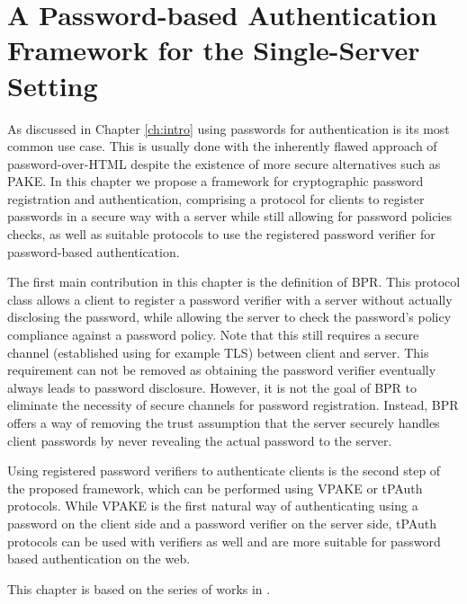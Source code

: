 \chapter[A Password Authentication Framework for the Single-Server Setting]{A Password-based Authentication Framework for the Single-Server Setting} \label{ch:vpake}

As discussed in Chapter \ref{ch:intro} using passwords for authentication is its most common use case. 
This is usually done with the inherently flawed approach of password-over-\ac{HTML} despite the existence of more secure alternatives such as \ac{PAKE}.
In this chapter we propose a framework for cryptographic password registration and authentication, comprising a protocol for clients to register passwords in a secure way with a server while still allowing for password policies checks, as well as suitable protocols to use the registered password verifier for password-based authentication.

The first main contribution in this chapter is the definition of \acl{BPR}.
This protocol class allows a client to register a password verifier with a server without actually disclosing the password, while allowing the server to check the password's policy compliance against a password policy.
Note that this still requires a secure channel (established using for example \ac{TLS}) between client and server.
This requirement can not be removed as obtaining the password verifier eventually always leads to password disclosure.
However, it is not the goal of \ac{BPR} to eliminate the necessity of secure channels for password registration.
Instead, \ac{BPR} offers a way of removing the trust assumption that the server securely handles client passwords by never revealing the actual password to the server.

Using registered password verifiers to authenticate clients is the second step of the proposed framework, which can be performed using \ac{VPAKE} or \ac{tPAuth} protocols.
While \ac{VPAKE} is the first natural way of authenticating using a password on the client side and a password verifier on the server side, \ac{tPAuth} protocols can be used with verifiers as well and are more suitable for password based authentication on the web.
 
\smallskip
\noindent
This chapter is based on the series of works in \cite{KieferM14b,KieferM15a,DongK15a}.
 
